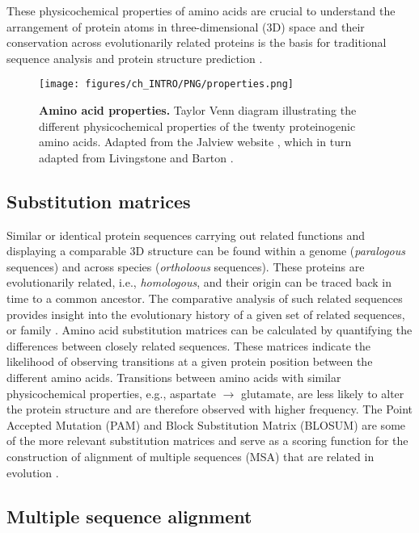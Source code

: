 These physicochemical properties of amino acids are crucial to understand the arrangement of protein atoms in three-dimensional (3D) space and their conservation across evolutionarily related proteins is the basis for traditional sequence analysis and protein structure prediction \cite{CHOTHIA_1986_CONSERVATION}.

\begin{figure}[htb!]
    \centering
    \texttt{[image: figures/ch\_INTRO/PNG/properties.png]}
    \caption[Amino acid properties]{\textbf{Amino acid properties.} Taylor Venn diagram illustrating the different physicochemical properties of the twenty proteinogenic amino acids. Adapted from the Jalview website \cite{JALVIEW}, which in turn adapted from Livingstone and Barton \cite{LIVINGSTONE_1993_MSA}.}
    \label{fig:properties}
\end{figure}

\subsection{Substitution matrices}

Similar or identical protein sequences carrying out related functions and displaying a comparable 3D structure can be found within a genome (\textit{paralogous} sequences) and across species (\textit{ortholoous} sequences). These proteins are evolutionarily related, i.e., \textit{homologous}, and their origin can be traced back in time to a common ancestor. The comparative analysis of such related sequences provides insight into the evolutionary history of a given set of related sequences, or family \cite{BARTON_1990_MSA}. Amino acid substitution matrices can be calculated by quantifying the differences between closely related sequences. These matrices indicate the likelihood of observing transitions at a given protein position between the different amino acids. Transitions between amino acids with similar physicochemical properties, e.g., aspartate $\rightarrow$ glutamate, are less likely to alter the protein structure and are therefore observed with higher frequency. The Point Accepted Mutation (PAM) \cite{DAYHOFF_1978_PAM} and Block Substitution Matrix (BLOSUM) \cite{HENIKOFF_1992_BLOSUM} are some of the more relevant substitution matrices and serve as a scoring function for the construction of alignment of multiple sequences (MSA) that are related in evolution \cite{BARTON_1987_MSA}.

\subsection{Multiple sequence alignment}

